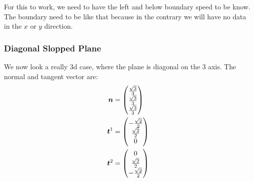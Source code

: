 % 
% 


For this to work, we need to have the left and below boundary speed to be know.
The boundary need to be like that because in the contrary we will have no data in the $x$ or $y$ direction.


\subsubsection{Diagonal Slopped Plane}

We now look a really 3d case, where the plane is diagonal on the 3 axis.
The normal and tangent vector are:
\begin{align}
	{\boldsymbol {n}}&=\begin{pmatrix}
		\frac{\sqrt{3}}{3}\\
		\frac{\sqrt{3}}{3}\\
		\frac{\sqrt{3}}{3}
	\end{pmatrix}\\
	{\boldsymbol {t}}^1&=\begin{pmatrix}
			-\frac{\sqrt{2}}{2}\\
			\frac{\sqrt{2}}{2}\\
			0
		\end{pmatrix}\\
		{\boldsymbol {t}}^2&=\begin{pmatrix}
			0\\
			\frac{\sqrt{2}}{2}\\
			-\frac{\sqrt{2}}{2}
		\end{pmatrix}
\end{align}

